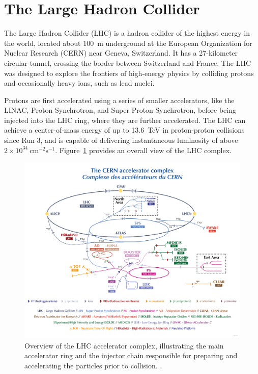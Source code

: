\section{The Large Hadron Collider} \label{sec:LHC}
The Large Hadron Collider (LHC) is a hadron collider of the highest energy in the world, located about 100~m underground at the European Organization for Nuclear Research (CERN) near Geneva, Switzerland. It has a 27-kilometer circular tunnel, crossing the border between Switzerland and France. The LHC was designed to explore the frontiers of high-energy physics by colliding protons and occasionally heavy ions, such as lead nuclei.

Protons are first accelerated using a series of smaller accelerators, like the LINAC, Proton Synchrotron, and Super Proton Synchrotron, before being injected into the LHC ring, where they are further accelerated. The LHC can achieve a center-of-mass energy of up to 13.6~TeV in proton-proton collisions since Run 3, and is capable of delivering instantaneous luminosity of above $2 \times 10^{34}~\mathrm{cm}^{-2}\mathrm{s}^{-1}$. Figure~\ref{fig:LHC_complex} provides an overall view of the LHC complex.

\begin{figure}[htbp]
  \centering
  \includegraphics[width=1.0\textwidth]{figs/chapter1/LHC_complex.png}
  \caption{Overview of the LHC accelerator complex, illustrating the main accelerator ring and the injector chain responsible for preparing and accelerating the particles prior to collision. \cite{LHCComplex}.}
  \label{fig:LHC_complex}
\end{figure}

